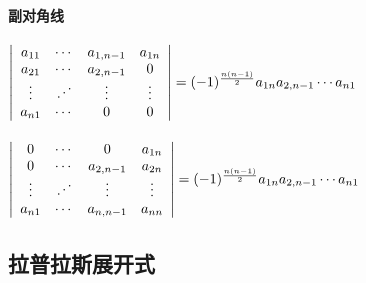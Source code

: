 \documentclass{article}
\begin{document}
\begin{flushleft}
	\paragraph{副对角线}
	$\left|\begin{array}{cccc} 
		a_{11}&\cdots&a_{1,n-1}&a_{1n}\\ 
		a_{21}&\cdots&a_{2,n-1}&0\\ 
		\vdots&\udots&\vdots&\vdots\\ 
		a_{n1}&\cdots&0&0\\ 
	\end{array}\right|=(-1)^{\frac{n(n-1)}{2}}a_{1n}a_{2,n-1}\cdots a_{n1}$\\
	~\\
	$\left|\begin{array}{cccc} 
		0&\cdots&0&a_{1n}\\ 
		0&\cdots&a_{2,n-1}&a_{2n}\\ 
		\vdots&\udots&\vdots&\vdots\\ 
		a_{n1}&\cdots&a_{n,n-1}&a_{nn}\\ 
	\end{array}\right|=(-1)^{\frac{n(n-1)}{2}}a_{1n}a_{2,n-1}\cdots a_{n1}$\\

	\subsection{拉普拉斯展开式}
	
	
\end{flushleft}
\end{document}
